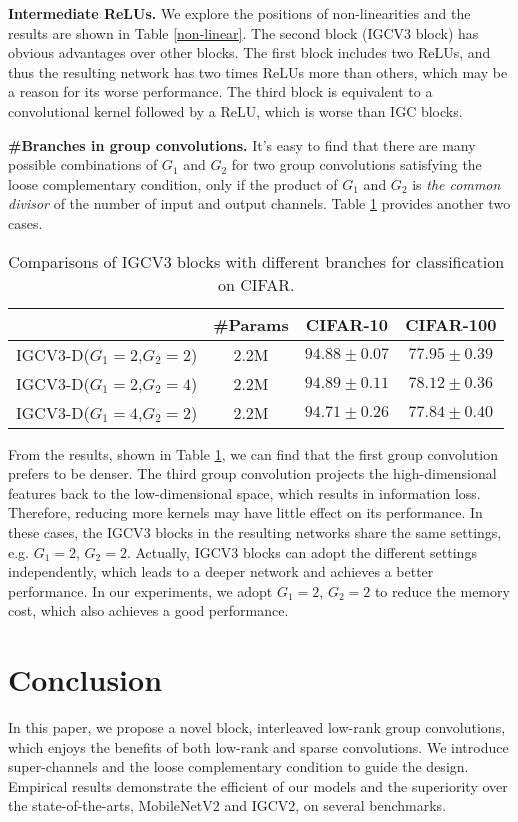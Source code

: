 \documentclass{bmvc2k}
\begin{document}
	\noindent\textbf{Intermediate ReLUs.} We explore the positions of non-linearities and the results are shown in Table \ref{non-linear}. The second block (IGCV$3$ block) has obvious advantages over other blocks. The first block includes two ReLUs, and thus the resulting network has two times ReLUs more than others, which may be a reason for its worse performance. The third block is equivalent to a convolutional kernel followed by a ReLU, which is worse than IGC blocks.

	\noindent\textbf{\#Branches in group convolutions.} It's easy to find that there are many possible combinations of $G_1$ and $G_2$ for two group convolutions satisfying the loose complementary condition, only if the product of $G_1$ and $G_2$ is \emph{the common divisor} of the number of input and output channels. Table \ref{sparsity} provides another two cases.
	\begin{table}[htb!]
		\centering
		\begin{tabular}{|c||c|c|c|}
			\hline
			& \#Params& CIFAR-10 & CIFAR-100\\
			\hline\hline
			IGCV3-D($G_1=2$,$G_2=2$) & 2.2M  & $94.88\pm0.07$ & $77.95\pm0.39$ \\
			IGCV3-D($G_1=2$,$G_2=4$) & 2.2M  & $\mathbf{94.89\pm0.11}$     &$\mathbf{78.12\pm0.36}$  \\
			IGCV3-D($G_1=4$,$G_2=2$) & 2.2M  & $94.71\pm0.26$     &$77.84\pm0.40$  \\
			\hline
		\end{tabular}
		\caption{Comparisons of IGCV$3$ blocks with different branches for classification on CIFAR.}
		\label{sparsity}
	\end{table}

	From the results, shown in Table \ref{sparsity}, we can find that the first group convolution prefers to be denser. The third group convolution projects the high-dimensional features back to the low-dimensional space, which results in information loss. Therefore, reducing more kernels may have little effect on its performance. In these cases, the IGCV$3$ blocks in the resulting networks share the same settings, e.g. $G_1=2$, $G_2=2$. Actually, IGCV$3$ blocks can adopt the different settings independently, which leads to a deeper network and achieves a better performance. In our experiments, we adopt $G_1=2$, $G_2=2$ to reduce the memory cost, which also achieves a good performance.

	\section{Conclusion}
	In this paper,
	we propose a novel block, interleaved low-rank group convolutions,
	which enjoys the benefits of both low-rank and sparse convolutions.
	We introduce super-channels and the loose complementary condition
	to guide the design.
	Empirical results demonstrate the efficient of our models and the superiority over the state-of-the-arts, MobileNetV$2$ and IGCV$2$, on several benchmarks.

	
\end{document}
